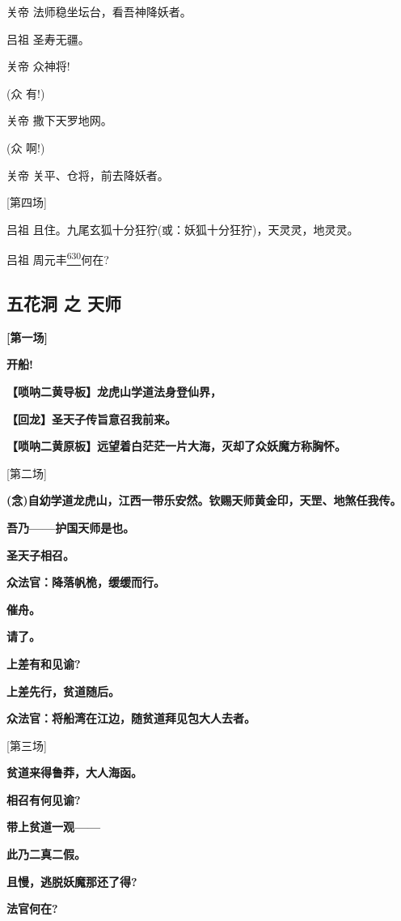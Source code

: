 关帝 法师稳坐坛台，看吾神降妖者。

吕祖 圣寿无疆。

关帝 众神将!

(众 有!)

关帝 撒下天罗地网。

(众 啊!)

关帝 关平、仓将，前去降妖者。

{[}第四场{]}

吕祖 且住。九尾玄狐十分狂狞(或：妖狐十分狂狞)，天灵灵，地灵灵。

吕祖 周元丰\protect\hyperlink{fn630}{\textsuperscript{630}}何在?

\newpage
\hypertarget{ux4e94ux82b1ux6d1e-ux4e4b-ux5929ux5e08}{%
\subsection{五花洞 之
天师}\label{ux4e94ux82b1ux6d1e-ux4e4b-ux5929ux5e08}}

\textbf{{[}第一场{]}}

\textbf{开船!}

\textbf{【唢呐二黄导板】龙虎山学道法身登仙界，}

\textbf{【回龙】圣天子传旨意召我前来。}

\textbf{【唢呐二黄原板】远望着白茫茫一片大海，灭却了众妖魔方称胸怀。}

{[}第二场{]}

\textbf{(念)自幼学道龙虎山，江西一带乐安然。钦赐天师黄金印，天罡、地煞任我传。}

\textbf{吾乃------护国天师是也。}

\textbf{圣天子相召。}

\textbf{众法官：降落帆桅，缓缓而行。}

\textbf{催舟。}

\textbf{请了。}

\textbf{上差有和见谕?}

\textbf{上差先行，贫道随后。}

\textbf{众法官：将船湾在江边，随贫道拜见包大人去者。}

{[}第三场{]}

\textbf{贫道来得鲁莽，大人海函。}

\textbf{相召有何见谕?}

\textbf{带上贫道一观------}

\textbf{此乃二真二假。}

\textbf{且慢，逃脱妖魔那还了得?}

\textbf{法官何在?}

